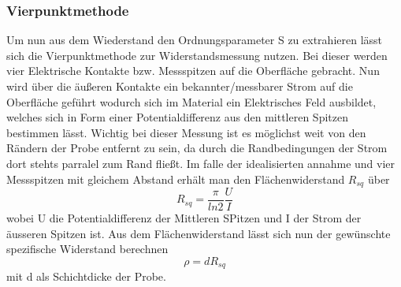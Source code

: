         \subsubsection{Vierpunktmethode}   
            Um nun aus dem Wiederstand den Ordnungsparameter S zu extrahieren lässt sich die Vierpunktmethode
            zur Widerstandsmessung nutzen. Bei dieser werden vier Elektrische Kontakte bzw. Messspitzen auf die 
            Oberfläche gebracht. Nun wird über die äußeren Kontakte ein bekannter/messbarer Strom auf die Oberfläche
            geführt wodurch sich im Material ein Elektrisches Feld ausbildet, welches sich in Form einer 
            Potentialdifferenz aus den mittleren Spitzen bestimmen lässt.
            Wichtig bei dieser Messung ist es möglichst weit von den Rändern der Probe entfernt zu sein, da durch die Randbedingungen der
            Strom dort stehts parralel zum Rand fließt. Im falle der idealisierten annahme und vier Messspitzen 
            mit gleichem Abstand erhält man den Flächenwiderstand $R_{sq}$ über
            \begin{equation}
                R_{sq} = \frac{\pi}{ln2}\frac{U}{I}
            \end{equation}
            wobei U die Potentialdifferenz der Mittleren SPitzen und I der Strom der äusseren Spitzen ist.
            Aus dem Flächenwiderstand lässt sich nun der gewünschte spezifische Widerstand berechnen
            \begin{equation}
                \rho = d R_{sq}
            \end{equation}
            mit d als Schichtdicke der Probe.
